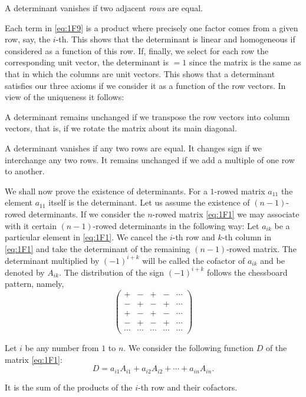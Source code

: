 \documentclass[10pt,leqno,a5paper]{book}
\theoremstyle{definition}
\begin{document}
A determinant vanishes if two adjacent \emph{rows} are equal.

Each term in \eqref{eq:1F9} is a product where precisely one factor comes from a given row, say, the $i$-th.
This shows that the determinant is linear and homogeneous if considered as a function of this row.
If, finally, we select for each row the corresponding unit vector, the determinant is $= 1$ since the matrix is the same as that in which the columns are unit vectors.
This shows that a determinant satisfies our three axioms if we consider it as a function of the row vectors.
In view of the uniqueness it follows:

A determinant remains unchanged if we transpose the row vectors into column vectors, that is, if we rotate the matrix about its main diagonal.

A determinant vanishes if any two rows are equal.
It changes sign if we interchange any two rows.
It remains unchanged if we add a multiple of one row to another.


We shall now prove the existence of determinants.
For a $1$-rowed matrix $a_{11}$ the element $a_{11}$ itself is the determinant.
Let us assume the existence of $(n-1)$-rowed determinants.
If we consider the $n$-rowed matrix \eqref{eq:1F1} we may associate with it certain $(n-1)$-rowed determinants in the following way:
Let $a_{ik}$ be a particular element in \eqref{eq:1F1}.
We cancel the $i$-th row and $k$-th column in \eqref{eq:1F1} and take the determinant of the remaining $(n-1)$-rowed matrix.
The determinant multiplied by $(-1)^{i+k}$ will be called the cofactor of $a_{ik}$ and be denoted by $A_{ik}$.
The distribution of the sign $(-1)^{i+k}$ follows the chessboard pattern, namely,
\[
\begin{pmatrix}
+ & - & + & - & \cdots
\\
- & + & - & + & \cdots
\\
+ & - & + & - & \cdots
\\
- & + & - & + & \cdots
\\
\cdots & \cdots & \cdots & \cdots & \cdots
\end{pmatrix}
\]

Let $i$ be any number from $1$ to $n$.
We consider the following function $D$ of the matrix \eqref{eq:1F1}:
\begin{equation}
\label{eq:13}
D = a_{i1} A_{i1} + a_{i2} A_{i2} + \cdots + a_{in} A_{in}.
\end{equation}

It is the sum of the products of the $i$-th row and their cofactors.
\end{document}
